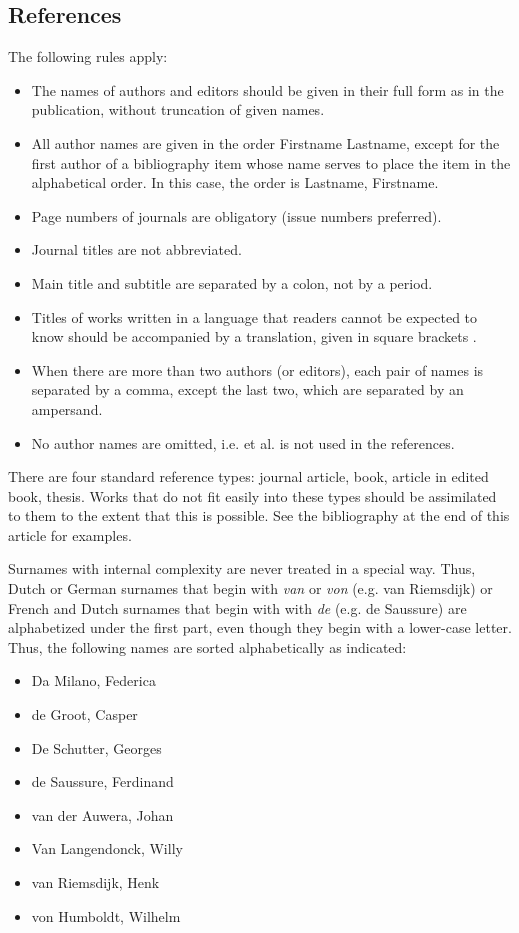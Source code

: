 \documentclass[charis,linguex,biblatex]{glossa}
\begin{document}
\subsection{References}

The following rules apply:

\begin{itemize}
\item The names of authors and editors should be given in their full form as in the publication, without truncation of given names.
\item All author names are given in the order Firstname Lastname, except for the first author of a bibliography item whose name serves to place the item in the alphabetical order. In this case, the order is Lastname, Firstname.
\item Page numbers of journals are obligatory (issue numbers preferred).
\item Journal titles are not abbreviated.
\item Main title and subtitle are separated by a colon, not by a period.
\item Titles of works written in a language that readers cannot be expected to know should be accompanied by a translation, given in square brackets \citep{Li1999}.
\item When there are more than two authors (or editors), each pair of names is separated by a comma, except the last two, which are separated by an ampersand. 
\item No author names are omitted, i.e. et al. is not used in the references.
\end{itemize}

There are four standard reference types: journal article, book, article in edited book, thesis. Works that do not fit easily into these types should be assimilated to them to the extent that this is possible. See the bibliography at the end of this article for examples.

Surnames with internal complexity are never treated in a special way. Thus, Dutch or German surnames that begin with \textit{van} or \textit{von} (e.g. van Riemsdijk) or French and Dutch surnames that begin with with \textit{de} (e.g. de Saussure) are alphabetized under the first part, even though they begin with a lower-case letter. Thus, the following names are sorted alphabetically as indicated:

\begin{itemize}
\item Da Milano, Federica
\item de Groot, Casper
\item De Schutter, Georges
\item de Saussure, Ferdinand
\item van der Auwera, Johan
\item Van Langendonck, Willy
\item van Riemsdijk, Henk
\item von Humboldt, Wilhelm
\end{itemize}
\end{document}
